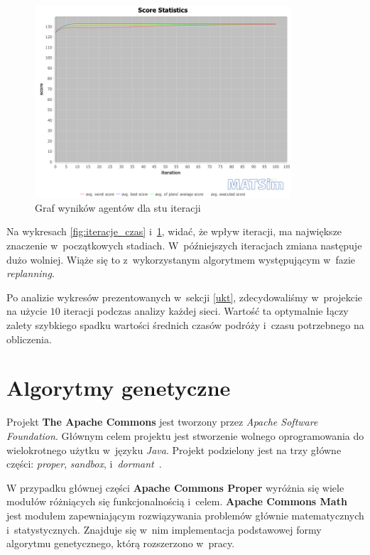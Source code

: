 \documentclass[twoside,12pt]{report}
\begin{document}
\begin{figure}[ht]
\centering
\includegraphics[width=0.85\textwidth]{img/def_scorestats}
\caption{Graf wyników agentów dla stu iteracji}
\label{fig:iteracje_wynik}
\end{figure}

Na wykresach \ref{fig:iteracje_czas} i~\ref{fig:iteracje_wynik}, widać, że wpływ iteracji, ma największe znaczenie w~początkowych stadiach. W~późniejszych iteracjach zmiana następuje dużo wolniej. Wiąże się to z~wykorzystanym algorytmem występującym w~fazie \textit{replanning}. 

Po analizie wykresów prezentowanych w~sekcji \ref{ukt}, zdecydowaliśmy w~projekcie na użycie $10$ iteracji podczas analizy każdej sieci. Wartość ta optymalnie łączy zalety szybkiego spadku wartości średnich czasów podróży i~czasu potrzebnego na obliczenia.


\section{Algorytmy genetyczne}

Projekt \textbf{The Apache Commons} jest tworzony przez \textit{Apache Software Foundation}. Głównym celem projektu jest stworzenie wolnego oprogramowania do wielokrotnego użytku w~języku \textit{Java}. Projekt podzielony jest na trzy główne części: \textit{proper}, \textit{sandbox}, i~\textit{dormant}~\cite{math}.

W przypadku głównej części\textbf{ Apache Commons Proper} wyróżnia się wiele modułów różniących się funkcjonalnością i~celem. \textbf{Apache Commons Math} jest modułem zapewniającym rozwiązywania problemów głównie matematycznych i~statystycznych. Znajduje się w~nim implementacja podstawowej formy algorytmu genetycznego, którą rozszerzono w~pracy.
\end{document}
